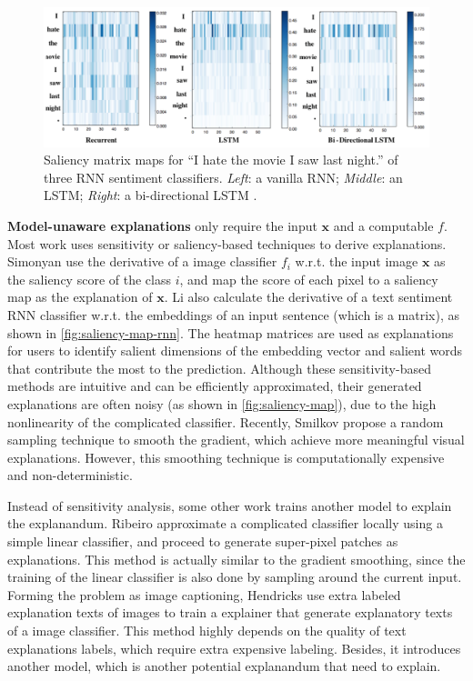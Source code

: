 \begin{figure}[tb]
  \centering
  \includegraphics[width=1.0\textwidth]{figure/saliency-map-rnn}
  \caption{Saliency matrix maps for ``I hate the movie I saw last night.'' of three RNN sentiment classifiers. \textit{Left}: a vanilla RNN; \textit{Middle}: an LSTM; \textit{Right}: a bi-directional LSTM \cite{simonyan14saliency}.}
  \label{fig:saliency-map-rnn}
\end{figure}

\textbf{Model-unaware explanations} only require the input $\mathbf{x}$ and a computable $f$. Most work uses sensitivity or saliency-based techniques to derive explanations. Simonyan \etal \cite{simonyan14saliency} use the derivative of a image classifier $f_i$ w.r.t. the input image $\mathbf{x}$ as the saliency score of the class $i$, and map the score of each pixel to a saliency map as the explanation of $\mathbf{x}$. Li \etal \cite{li2016naccl-hlt} also calculate the derivative of a text sentiment RNN classifier w.r.t. the embeddings of an input sentence (which is a matrix), as shown in \autoref{fig:saliency-map-rnn}. The heatmap matrices are used as explanations for users to identify salient dimensions of the embedding vector and salient words that contribute the most to the prediction. Although these sensitivity-based methods are intuitive and can be efficiently approximated, their generated explanations are often noisy (as shown in \autoref{fig:saliency-map}), due to the high nonlinearity of the complicated classifier. Recently, Smilkov \etal \cite{smilkov2017smoothgrad} propose a random sampling technique to smooth the gradient, which achieve more meaningful visual explanations. However, this smoothing technique is computationally expensive and non-deterministic.

Instead of sensitivity analysis, some other work trains another model to explain the explanandum. Ribeiro \etal \cite{ribeiro2016kdd} approximate a complicated classifier locally using a simple linear classifier, and proceed to generate super-pixel patches as explanations. This method is actually similar to the gradient smoothing, since the training of the linear classifier is also done by sampling around the current input. Forming the problem as image captioning, Hendricks \etal \cite{hendricks16generate} use extra labeled explanation texts of images to train a explainer that generate explanatory texts of a image classifier. This method highly depends on the quality of text explanations labels, which require extra expensive labeling. Besides, it introduces another model, which is another potential explanandum that need to explain.

